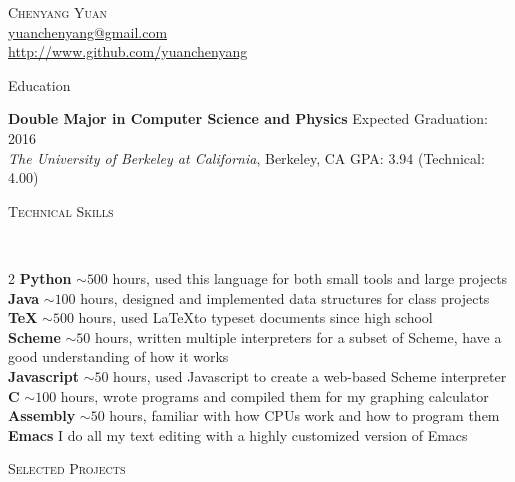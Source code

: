 \documentclass[9pt]{article}
\newenvironment{changemargin}[2]{%
  \begin{list}{}{%
      \setlength{\topsep}{0pt}%
      \setlength{\leftmargin}{#1}%
      \setlength{\rightmargin}{#2}%
      \setlength{\listparindent}{\parindent}%
      \setlength{\itemindent}{\parindent}%
      \setlength{\parsep}{\parskip}%
    }%
  \item[]}{\end{list}
}
\newcommand{\lineover}{
  \begin{changemargin}{-0.05in}{-0.05in}
    \vspace*{-8pt}
    \hrulefill \\
    \vspace*{-2pt}
  \end{changemargin}
}
\newcommand{\header}[1]{
  \begin{changemargin}{-0.5in}{-0.5in}
    \scshape{#1}\\
    \lineover
  \end{changemargin}
}
\newcommand{\contact}[4]{
  \begin{changemargin}{-0.5in}{-0.5in}
    \begin{center}
      {\Large \scshape {#1}}\\ \smallskip
      {#2}\\ \smallskip 
      {#3}\\ \smallskip
      {#4}\smallskip
    \end{center}
  \end{changemargin}
}
\newenvironment{body} {
  \vspace*{-16pt}
  \begin{changemargin}{-0.25in}{-0.5in}
  }	
  {\end{changemargin}
}
\begin{document}
\contact{Chenyang Yuan}{\href{mailto:yuanchenyang@gmail.com}{yuanchenyang@gmail.com}}{\url{http://www.github.com/yuanchenyang}}

\header{Education}

\begin{body}
  \vspace{14pt}
  \textbf{Double Major in Computer Science and Physics} \hfill Expected Graduation: 2016 \\
  \emph{The University of Berkeley at California}, Berkeley, CA{} \hfill GPA: 3.94 (Technical: 4.00)\\
\end{body}

\smallskip

\header{Technical Skills}

\begin{body}
  \vspace{14pt}
  \begin{multicols}{2}
    \textbf{Python} $\sim 500$ hours, used this language for both small tools and large projects\\
    \textbf{Java} $\sim 100$ hours, designed and implemented data structures for class projects \\
    \textbf{\TeX} $\sim 500$ hours, used \LaTeX to typeset documents since high school \\
    \textbf{Scheme} $\sim 50$ hours, written multiple interpreters for a subset of Scheme, have a good understanding of how it works\\
    \textbf{Javascript} $\sim 50$ hours, used Javascript to create a web-based Scheme interpreter\\
    \textbf{C} $\sim 100$ hours, wrote programs and compiled them for my graphing
    calculator\\
    \textbf{Assembly} $\sim 50$ hours, familiar with how CPUs work and how to program them\\
    \textbf{Emacs} I do all my text editing with a highly customized version of Emacs\\
  \end{multicols}
\end{body}

\smallskip

\header{Selected Projects}
\end{document}
